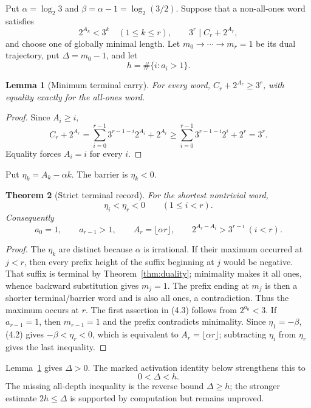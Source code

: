 \documentclass[11pt,reqno]{amsart}
\newtheorem{theorem}{Theorem}[section]
\newtheorem{lemma}[theorem]{Lemma}
\theoremstyle{remark}
\begin{document}
Put $\alpha=\log_2 3$ and $\beta=\alpha-1=\log_2(3/2)$.  Suppose that a
non-all-ones word satisfies
\[
 2^{A_k}<3^k\quad(1\le k\le r),\qquad
 3^r\mid C_r+2^{A_r},                                 \tag{4.1}
\]
and choose one of globally minimal length.  Let
$m_0\to\cdots\to m_r=1$ be its dual trajectory, put
$\Delta=m_0-1$, and let
\[
 h=\#\{i:a_i>1\}.
\]

\begin{lemma}[Minimum terminal carry]\label{lem:mincarry}
For every word, $C_r+2^{A_r}\ge3^r$, with equality exactly for the
all-ones word.
\end{lemma}

\begin{proof}
Since $A_i\ge i$,
\[
 C_r+2^{A_r}=\sum_{i=0}^{r-1}3^{r-1-i}2^{A_i}+2^{A_r}
 \ge\sum_{i=0}^{r-1}3^{r-1-i}2^i+2^r=3^r.
\]
Equality forces $A_i=i$ for every $i$.
\end{proof}

Put $\eta_k=A_k-\alpha k$.  The barrier is $\eta_k<0$.

\begin{theorem}[Strict terminal record]\label{thm:record}
For the shortest nontrivial word,
\[
 \eta_i<\eta_r<0\qquad(1\le i<r).                    \tag{4.2}
\]
Consequently
\[
 a_0=1,\qquad a_{r-1}>1,\qquad
 A_r=\lfloor\alpha r\rfloor,
 \qquad2^{A_r-A_i}>3^{r-i}\ (i<r).                  \tag{4.3}
\]
\end{theorem}

\begin{proof}
The $\eta_k$ are distinct because $\alpha$ is irrational.  If their maximum
occurred at $j<r$, then every prefix height of the suffix beginning at $j$
would be negative.  That suffix is terminal by
Theorem~\ref{thm:duality}; minimality makes it all ones, whence backward
substitution gives $m_j=1$.  The prefix ending at $m_j$ is then a shorter
terminal/barrier word and is also all ones, a contradiction.  Thus the
maximum occurs at $r$.  The first assertion in (4.3) follows from
$2^{a_0}<3$.  If $a_{r-1}=1$, then $m_{r-1}=1$ and the prefix contradicts
minimality.  Since $\eta_1=-\beta$, (4.2) gives
$-\beta<\eta_r<0$, which is equivalent to
$A_r=\lfloor\alpha r\rfloor$; subtracting $\eta_i$ from $\eta_r$ gives the
last inequality.
\end{proof}

Lemma~\ref{lem:mincarry} gives $\Delta>0$.  The marked activation identity
below strengthens this to
\[
 0<\Delta<h.                                          \tag{4.4}
\]
The missing all-depth inequality is the reverse bound $\Delta\ge h$; the
stronger estimate $2h\le\Delta$ is supported by computation but remains
unproved.
\end{document}
